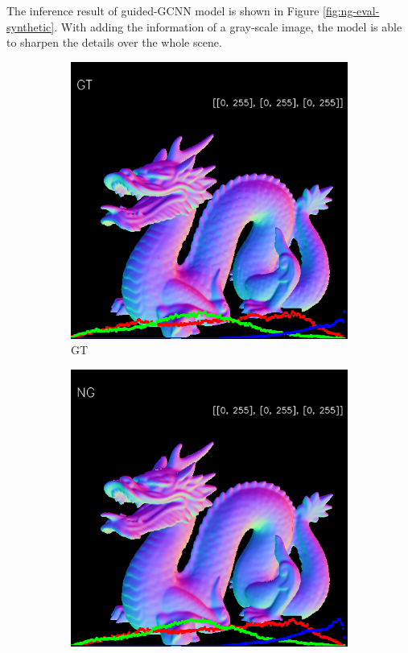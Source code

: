 The inference result of guided-GCNN model is shown in Figure \ref{fig:ng-eval-synthetic}. With adding the information of a gray-scale image, the model is able to sharpen the details over the whole scene. 

\begin{figure}[h!]
	\centering
	\begin{subfigure}[b]{0.19\linewidth}
		\includegraphics[width=\linewidth]{./Figures/ng-synthetic/fancy_eval_3_groundtruth.png}
		\caption{GT}
	\end{subfigure}
	\begin{subfigure}[b]{0.19\linewidth}
		\includegraphics[width=\linewidth]{./Figures/ng-synthetic/fancy_eval_3_normal_NG.png}

\end{subfigure}
\end{figure}
